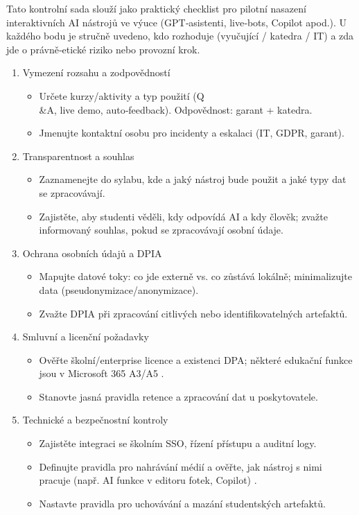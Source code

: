 Tato kontrolní sada slouží jako praktický checklist pro pilotní nasazení interaktivních AI nástrojů ve výuce (GPT‑asistenti, live‑bots, Copilot apod.). U každého bodu je stručně uvedeno, kdo rozhoduje (vyučující / katedra / IT) a zda jde o právně‑etické riziko nebo provozní krok.

\begin{enumerate}
  \item Vymezení rozsahu a zodpovědností
    \begin{itemize}
      \item Určete kurzy/aktivity a typ použití (Q\\ \&A, live demo, auto‑feedback). Odpovědnost: garant + katedra.
      \item Jmenujte kontaktní osobu pro incidenty a eskalaci (IT, GDPR, garant).
    \end{itemize}

  \item Transparentnost a souhlas
    \begin{itemize}
      \item Zaznamenejte do sylabu, kde a jaký nástroj bude použit a jaké typy dat se zpracovávají.
      \item Zajistěte, aby studenti věděli, kdy odpovídá AI a kdy člověk; zvažte informovaný souhlas, pokud se zpracovávají osobní údaje.
    \end{itemize}

  \item Ochrana osobních údajů a DPIA
    \begin{itemize}
      \item Mapujte datové toky: co jde externě vs. co zůstává lokálně; minimalizujte data (pseudonymizace/anonymizace).
      \item Zvažte DPIA při zpracování citlivých nebo identifikovatelných artefaktů.
    \end{itemize}

  \item Smluvní a licenční požadavky
    \begin{itemize}
      \item Ověřte školní/enterprise licence a existenci DPA; některé edukační funkce jsou v Microsoft 365 A3/A5 \cite{kb_ai_101_tipu_pdf_04e4a115_page_15_2}.
      \item Stanovte jasná pravidla retence a zpracování dat u poskytovatele.
    \end{itemize}

  \item Technické a bezpečnostní kontroly
    \begin{itemize}
      \item Zajistěte integraci se školním SSO, řízení přístupu a auditní logy.
      \item Definujte pravidla pro nahrávání médií a ověřte, jak nástroj s nimi pracuje (např. AI funkce v editoru fotek, Copilot) \cite{kb_ai_101_tipu_pdf_04e4a115_page_53_1}.
      \item Nastavte pravidla pro uchovávání a mazání studentských artefaktů.
    \end{itemize}


\end{enumerate}
